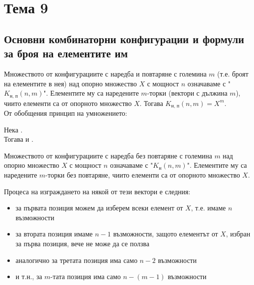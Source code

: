\section{Тема 9}

\subsection*{Основни комбинаторни конфигурации и формули за броя на елементите им} 

\begin{definition}
    Множеството от конфигурациите с наредба и повтаряне с големина \(m\) (т.е. броят на елементите в нея) 
    над опорно множество \(X\) с мощност \(n\) означаваме с "\(K_\text{н, п}(n, m)\)". Елементите му са 
    наредените \(m\)-торки (вектори с дължина \(m\)), чиито елементи са от опорното множество \(X\). 
    Тогава \(K_\text{н, п}(n, m) = X^m\). \\
    От обобщения принцип на умножението: 
\end{definition}

\begin{example}
    Нека . \\
    Тогава  и .
\end{example}

\begin{definition}
    Множеството от конфигурациите с наредба без повтаряне с големина \(m\) 
    над опорно множество \(X\) с мощност \(n\) означаваме с "\(K_\text{н}(n, m)\)". Елементите му са 
    наредените \(m\)-торки без повтаряне, чиито елементи са от опорното множество \(X\).
\end{definition}

Процеса на изграждането на някой от тези вектори е следния: 
\begin{itemize}
    \item за първата позиция можем да изберем всеки елемент от \(X\), т.е. имаме \(n\) възможности
    \item за втората позиция имаме \(n - 1\) възможности, защото елементът от \(X\), избран за първа позиция,
    вече не може да се ползва
    \item аналогично за третата позиция има само \(n - 2\) възможности
    \item и т.н., за \(m\)-тата позиция има само \(n - (m - 1)\) възможности
\end{itemize}

